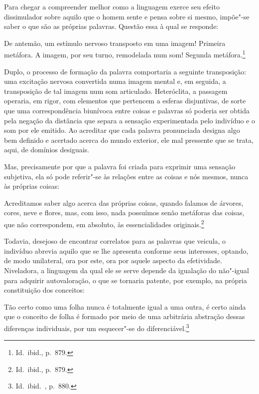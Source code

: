 Para chegar a compreender melhor como a linguagem exerce seu efeito
dissimulador sobre aquilo que o homem sente e pensa sobre si mesmo,
impõe"-se saber o que são as próprias palavras. Questão essa à qual se
responde: 
\begin{hedraquote}
De antemão, um estímulo nervoso transposto em uma imagem!
Primeira metáfora. A imagem, por seu turno, remodelada num som! Segunda
metáfora.\footnote{ Id.~ibid., p.~879.} 
\end{hedraquote}
Duplo, o processo de formação
da palavra comportaria a seguinte transposição: uma excitação nervosa
convertida numa imagem mental e, em seguida, a transposição de tal
imagem num som articulado. Heteróclita, a passagem operaria, em rigor,
com elementos que pertencem a esferas disjuntivas, de sorte
que uma correspondência biunívoca entre coisas e palavras só poderia
ser obtida pela negação da distância que separa a sensação
experimentada pelo indivíduo e o som por ele emitido. Ao acreditar que
cada palavra pronunciada designa algo bem definido e acertado acerca do
mundo exterior, ele mal pressente que se trata, aqui, de domínios desiguais.

Mas, precisamente por que a palavra foi criada para exprimir uma
sensação subjetiva, ela só pode referir"-se às relações entre as
coisas e nós mesmos, nunca às próprias coisas: 
\begin{hedraquote}
Acreditamos saber algo
acerca das próprias coisas, quando falamos de árvores, cores, neve e
flores, mas, com isso, nada possuímos senão metáforas das coisas, que
não correspondem, em absoluto, às essencialidades originais.\footnote{
Id.~ibid., p.~879.}
\end{hedraquote}
Todavia, desejoso de encontrar correlatos para as
palavras que veicula, o indivíduo abrevia aquilo que se lhe apresenta
conforme seus interesses, optando, de modo unilateral, ora por este,
ora por aquele aspecto da efetividade. Niveladora, a linguagem da qual
ele se serve depende da igualação do não"-igual para adquirir
autovaloração, o que se tornaria patente, por exemplo, na própria
constituição dos conceitos: 
\begin{hedraquote}
Tão certo como uma folha
nunca é totalmente igual a uma outra, é certo ainda que o conceito de
folha é formado por meio de uma arbitrária abstração dessas diferenças
individuais, por um esquecer"-se 
do diferenciável.\footnote{ Id.~ibid.~, p.~880.}
\end{hedraquote}


